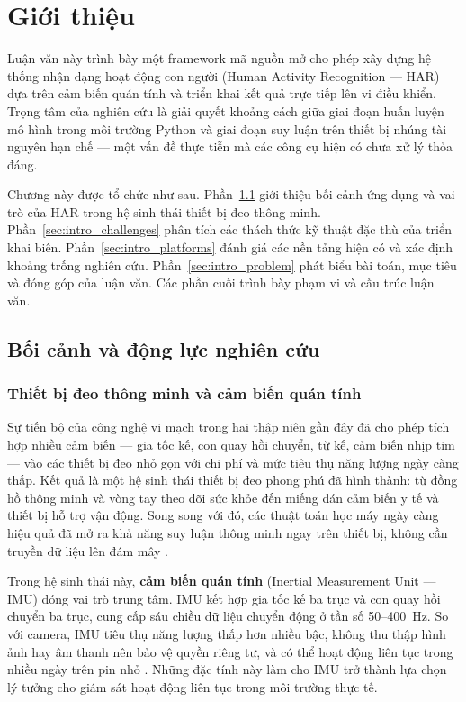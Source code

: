 \chapter{Giới thiệu}
\label{chap:introduction}

Luận văn này trình bày một framework mã nguồn mở cho phép xây dựng hệ thống nhận dạng hoạt động con người (Human Activity Recognition --- HAR) dựa trên cảm biến quán tính và triển khai kết quả trực tiếp lên vi điều khiển. Trọng tâm của nghiên cứu là giải quyết khoảng cách giữa giai đoạn huấn luyện mô hình trong môi trường Python và giai đoạn suy luận trên thiết bị nhúng tài nguyên hạn chế --- một vấn đề thực tiễn mà các công cụ hiện có chưa xử lý thỏa đáng.

Chương này được tổ chức như sau. Phần~\ref{sec:intro_context} giới thiệu bối cảnh ứng dụng và vai trò của HAR trong hệ sinh thái thiết bị đeo thông minh. Phần~\ref{sec:intro_challenges} phân tích các thách thức kỹ thuật đặc thù của triển khai biên. Phần~\ref{sec:intro_platforms} đánh giá các nền tảng hiện có và xác định khoảng trống nghiên cứu. Phần~\ref{sec:intro_problem} phát biểu bài toán, mục tiêu và đóng góp của luận văn. Các phần cuối trình bày phạm vi và cấu trúc luận văn.

\section{Bối cảnh và động lực nghiên cứu}
\label{sec:intro_context}

\subsection{Thiết bị đeo thông minh và cảm biến quán tính}

Sự tiến bộ của công nghệ vi mạch trong hai thập niên gần đây đã cho phép tích hợp nhiều cảm biến --- gia tốc kế, con quay hồi chuyển, từ kế, cảm biến nhịp tim --- vào các thiết bị đeo nhỏ gọn với chi phí và mức tiêu thụ năng lượng ngày càng thấp. Kết quả là một hệ sinh thái thiết bị đeo phong phú đã hình thành: từ đồng hồ thông minh và vòng tay theo dõi sức khỏe đến miếng dán cảm biến y tế và thiết bị hỗ trợ vận động. Song song với đó, các thuật toán học máy ngày càng hiệu quả đã mở ra khả năng suy luận thông minh ngay trên thiết bị, không cần truyền dữ liệu lên đám mây \cite{warden2019tinyml}.

Trong hệ sinh thái này, \textbf{cảm biến quán tính} (Inertial Measurement Unit --- IMU) đóng vai trò trung tâm. IMU kết hợp gia tốc kế ba trục và con quay hồi chuyển ba trục, cung cấp sáu chiều dữ liệu chuyển động ở tần số 50--400~Hz. So với camera, IMU tiêu thụ năng lượng thấp hơn nhiều bậc, không thu thập hình ảnh hay âm thanh nên bảo vệ quyền riêng tư, và có thể hoạt động liên tục trong nhiều ngày trên pin nhỏ \cite{filippeschi2017survey_imu}. Những đặc tính này làm cho IMU trở thành lựa chọn lý tưởng cho giám sát hoạt động liên tục trong môi trường thực tế.

